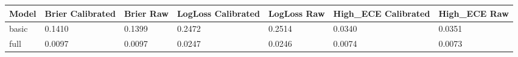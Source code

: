 \begin{tabular}{lllllll}
\toprule
Model & Brier Calibrated & Brier Raw & LogLoss Calibrated & LogLoss Raw & High\_ECE Calibrated & High\_ECE Raw \\
\midrule
basic & 0.1410 & 0.1399 & 0.2472 & 0.2514 & 0.0340 & 0.0351 \\
full & 0.0097 & 0.0097 & 0.0247 & 0.0246 & 0.0074 & 0.0073 \\
\bottomrule
\end{tabular}